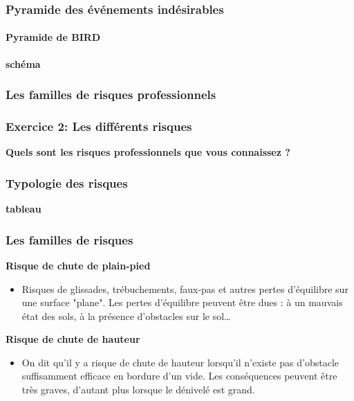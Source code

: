 \documentclass{beamer}
\begin{document}
\begin{frame}
\frametitle{Pyramide des événements indésirables}
\framesubtitle{Pyramide de BIRD}
\textbf{schéma}
\end{frame}

\begin{frame}
\frametitle{Les familles de risques professionnels}
\end{frame}

\begin{frame}
\frametitle{Exercice 2: Les différents risques}

\textbf{Quels sont les risques professionnels que vous connaissez ?}
\end{frame}

\begin{frame}
\frametitle{Typologie des risques}

\textbf{tableau}
\end{frame}

\begin{frame}
\frametitle{Les familles de risques}

\textbf{Risque de chute de plain-pied}
\begin{itemize}
\item Risques de glissades, trébuchements, faux-pas et autres pertes d'équilibre sur une surface "plane". Les pertes d’équilibre peuvent être dues : à un mauvais état des sols, à la présence d’obstacles sur le sol…
\end{itemize}
\textbf{Risque de chute de hauteur}
\begin{itemize}
\item On dit qu'il y a risque de chute de hauteur lorsqu'il n'existe pas d'obstacle suffisamment efficace en bordure d'un vide. Les conséquences peuvent être très graves, d’autant plus lorsque le dénivelé est grand.
\end{itemize}
\end{frame}
\end{document}
